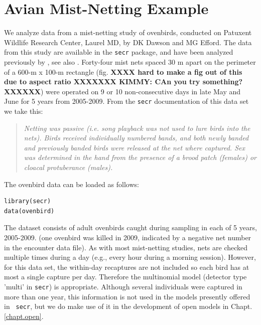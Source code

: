 \section{Avian Mist-Netting Example}
\label{poisson-mn.sec.ovenbird}

We analyze data from a mist-netting study of ovenbirds, conducted on
Patuxent Wildlife Research Center, Laurel MD, by DK Dawson and MG
Efford. The data from this study are available in the \mbox{\tt secr}
package, and have been analyzed previously by
\citet{efford_etal:2004}, see also \citet{borchers_efford:2008}.
Forty-four mist nets spaced 30 m apart on the perimeter of a 600-m x
100-m rectangle (fig. {\bf XXXX hard to make a fig out of this due to
aspect ratio XXXXXXX KIMMY: CAn you try something? XXXXXX}) were operated on 9 or 10 non-consecutive
days in late May and June for 5 years from 2005-2009.  From the
\mbox{\tt secr} documentation of this data set we take this:
\begin{quote}
{\it
  Netting was passive (i.e. song playback was not used to lure birds
  into the nets). Birds received individually numbered bands, and both
  newly banded and previously banded birds were released at the net
  where captured. Sex was determined in the hand from the presence of
  a brood patch (females) or cloacal protuberance (males).}
\end{quote}
The ovenbird 
data can be loaded as follows:
\begin{verbatim}
library(secr)
data(ovenbird)
\end{verbatim}
The dataset consists of adult ovenbirds caught during sampling in each
of 5 years, 2005-2009. (one ovenbird was killed in 2009, indicated by
a negative net number in the encounter data file).
As with most mist-netting studies, nets are checked multiple times
during a day (e.g., every hour during a morning session). However, for
this data set, the within-day recaptures are not included so each bird
has at most a single capture per day. Therefore the multinomial model
(detector type 'multi' in \mbox{\tt secr}) is appropriate. 
 Although
several individuals were captured in more than one year, this
information is not used in the models presently offered in \mbox{\tt
  secr}, but we do make use of it in the development of open models in
Chapt. \ref{chapt.open}.
%


